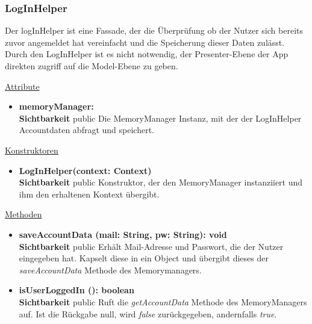 \subsubsection{LogInHelper} \label{app:klasse:LogInHelper}
Der logInHelper ist eine Fassade, der die Überprüfung ob der Nutzer sich bereits zuvor angemeldet hat vereinfacht und die Speicherung dieser Daten zulässt. Durch den LogInHelper ist es nicht notwendig, der Presenter-Ebene der App direkten zugriff auf die Model-Ebene zu geben.
\newline

\underline{Attribute}
\begin{itemize}
\itemsep0pt
\item \textbf{memoryManager: } \hfill\\ 
\textbf{Sichtbarkeit} public\newline
Die MemoryManager Instanz, mit der der LogInHelper Accountdaten abfragt und speichert.

\end{itemize}

\underline{Konstruktoren}
\begin{itemize}
\itemsep0pt
\item \textbf{LogInHelper(context: Context)} \hfill\\
\textbf{Sichtbarkeit} public\newline
Konstruktor, der den MemoryManager instanziiert und ihm den erhaltenen Kontext übergibt. 
\end{itemize}

\underline{Methoden}
\begin{itemize}
\itemsep0pt
\item \textbf{saveAccountData (mail: String, pw: String): void}\hfill\\
\textbf{Sichtbarkeit} public\newline
Erhält Mail-Adresse und Passwort, die der Nutzer eingegeben hat. Kapselt diese in ein  Object und übergibt dieses der \textit{saveAccountData} Methode des Memorymanagers.

\item \textbf{isUserLoggedIn (): boolean}\hfill\\
\textbf{Sichtbarkeit} public\newline
Ruft die \textit{getAccountData} Methode des MemoryManagers auf. Ist die Rückgabe null, wird \textit{false} zurückgegeben, andernfalls \textit{true}.

\end{itemize}